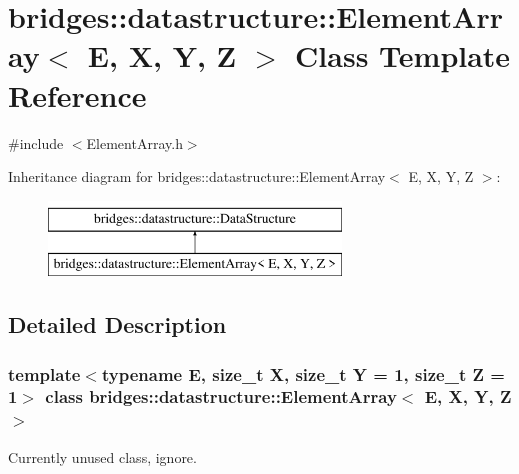 \hypertarget{classbridges_1_1datastructure_1_1_element_array}{}\section{bridges\+::datastructure\+::Element\+Array$<$ E, X, Y, Z $>$ Class Template Reference}
\label{classbridges_1_1datastructure_1_1_element_array}


{\ttfamily \#include $<$Element\+Array.\+h$>$}

Inheritance diagram for bridges\+::datastructure\+::Element\+Array$<$ E, X, Y, Z $>$\+:\begin{figure}[H]
\begin{center}
\leavevmode
\includegraphics[height=2.000000cm]{classbridges_1_1datastructure_1_1_element_array}
\end{center}
\end{figure}


\subsection{Detailed Description}
\subsubsection*{template$<$typename E, size\+\_\+t X, size\+\_\+t Y = 1, size\+\_\+t Z = 1$>$\newline
class bridges\+::datastructure\+::\+Element\+Array$<$ E, X, Y, Z $>$}

Currently unused class, ignore. 

